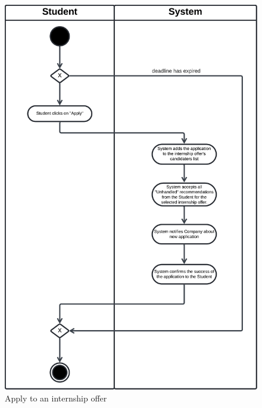 \begin{figure}[H]
    \begin{center}
         \includegraphics[width=0.9\linewidth]{LaTeXCode/images/activity diagram/UC9.png}
         \caption{Apply to an internship offer}
         \label{fig:apply_to_internships_ad}
     \end{center}
\end{figure}

\newpage

